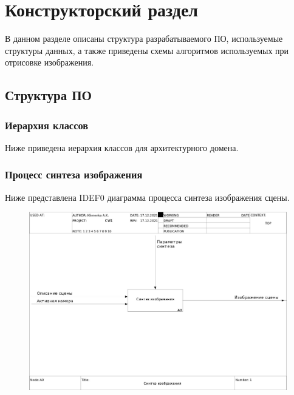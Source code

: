 \chapter{Конструкторский раздел}

В данном разделе описаны структура разрабатываемого ПО, используемые структуры данных, а также приведены схемы алгоритмов используемых при отрисовке изображения.

\section{Структура ПО}

\subsection{Иерархия классов}

Ниже приведена иерархия классов для архитектурного домена.



\subsection{Процесс синтеза изображения}

Ниже представлена IDEF0 диаграмма процесса синтеза изображения сцены.

\begin{figure}
    \centering
    \includegraphics[width=\linewidth,height=\textheight,keepaspectratio]{idef0/01_A0.jpg}
\end{figure}

